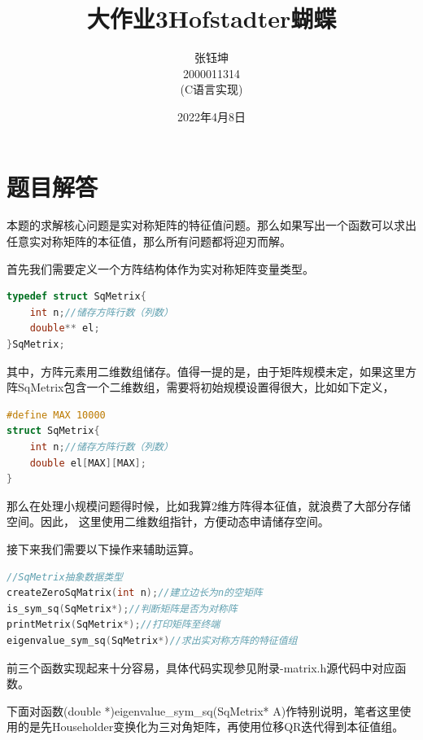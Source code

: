 \documentclass[10pt, a4paper]{article}
\title{\heiti 大作业3\phantom{   }Hofstadter蝴蝶}
\author{ 张钰坤 \\  2000011314 \\(C语言实现)}
\date{2022年4月8日}
\begin{document}
    \maketitle
    \tableofcontents
    \newpage

    \section{题目解答}

    本题的求解核心问题是实对称矩阵的特征值问题。那么如果写出一个函数可以求出任意实对称矩阵的本征值，那么所有问题都将迎刃而解。

    首先我们需要定义一个方阵结构体作为实对称矩阵变量类型。

    \begin{lstlisting}[language=C]
typedef struct SqMetrix{
    int n;//储存方阵行数（列数）
    double** el;
}SqMetrix;
    \end{lstlisting}

    其中，方阵元素用二维数组储存。值得一提的是，由于矩阵规模未定，如果这里方阵SqMetrix包含一个二维数组，需要将初始规模设置得很大，比如如下定义，

    \begin{lstlisting}[language=C]
#define MAX 10000
struct SqMetrix{
    int n;//储存方阵行数（列数）
    double el[MAX][MAX];
}
    \end{lstlisting}

    那么在处理小规模问题得时候，比如我算2维方阵得本征值，就浪费了大部分存储空间。因此，
    这里使用二维数组指针，方便动态申请储存空间。

    接下来我们需要以下操作来辅助运算。

    \begin{lstlisting}[language=C]
//SqMetrix抽象数据类型
createZeroSqMatrix(int n);//建立边长为n的空矩阵
is_sym_sq(SqMetrix*);//判断矩阵是否为对称阵
printMetrix(SqMetrix*);//打印矩阵至终端
eigenvalue_sym_sq(SqMetrix*)//求出实对称方阵的特征值组
    \end{lstlisting}
    
    前三个函数实现起来十分容易，具体代码实现参见附录-matrix.h源代码中对应函数。
    
    下面对函数(double *)eigenvalue_sym_sq(SqMetrix* A)作特别说明，笔者这里使用的是先Householder变换化为三对角矩阵，再使用位移QR迭代得到本征值组。
\end{document}
